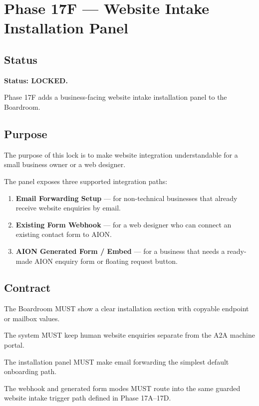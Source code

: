 \section{Phase 17F --- Website Intake Installation Panel}
\label{sec:aion-phase17f-website-intake-installation-panel}

\subsection{Status}

\textbf{Status: LOCKED.}

Phase 17F adds a business-facing website intake installation panel to the Boardroom.

\subsection{Purpose}

The purpose of this lock is to make website integration understandable for a small business owner or a web designer.

The panel exposes three supported integration paths:

\begin{enumerate}
  \item \textbf{Email Forwarding Setup} --- for non-technical businesses that already receive website enquiries by email.
  \item \textbf{Existing Form Webhook} --- for a web designer who can connect an existing contact form to AION.
  \item \textbf{AION Generated Form / Embed} --- for a business that needs a ready-made AION enquiry form or floating request button.
\end{enumerate}

\subsection{Contract}

The Boardroom MUST show a clear installation section with copyable endpoint or mailbox values.

The system MUST keep human website enquiries separate from the A2A machine portal.

The installation panel MUST make email forwarding the simplest default onboarding path.

The webhook and generated form modes MUST route into the same guarded website intake trigger path defined in Phase 17A--17D.

